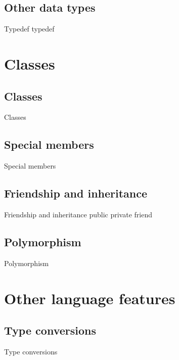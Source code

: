 \documentclass{beamer}
\begin{document}
\subsection{Other data types}
\begin{frame}{Typedef}
typedef
\end{frame}


\section{Classes}
\subsection{Classes}
\begin{frame}{Classes}

\end{frame}

\subsection{Special members}
\begin{frame}{Special members}

\end{frame}

\subsection{Friendship and inheritance}
\begin{frame}{Friendship and inheritance}
public
private
friend
\end{frame}

\subsection{Polymorphism}
\begin{frame}{Polymorphism}

\end{frame}


\section{Other language features}
\subsection{Type conversions}
\begin{frame}{Type conversions}

\end{frame}
\end{document}
